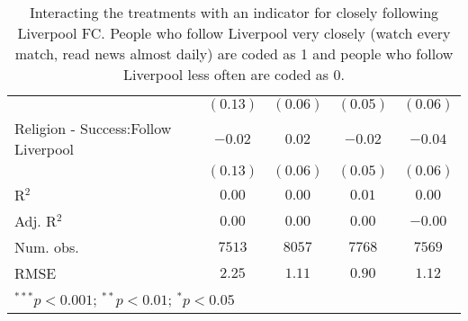 \begin{table}[H]
\begin{center}
\begin{footnotesize}
\begin{tabular}{l c c c c}
                                     & $(0.13)$ & $(0.06)$     & $(0.05)$     & $(0.06)$     \\
Religion - Success:Follow Liverpool  & $-0.02$  & $0.02$       & $-0.02$      & $-0.04$      \\
                                     & $(0.13)$ & $(0.06)$     & $(0.05)$     & $(0.06)$     \\
\hline
R$^2$                                & $0.00$   & $0.00$       & $0.01$       & $0.00$       \\
Adj. R$^2$                           & $0.00$   & $0.00$       & $0.00$       & $-0.00$      \\
Num. obs.                            & $7513$   & $8057$       & $7768$       & $7569$       \\
RMSE                                 & $2.25$   & $1.11$       & $0.90$       & $1.12$       \\
\hline
\multicolumn{5}{l}{\tiny{$^{***}p<0.001$; $^{**}p<0.01$; $^{*}p<0.05$}}
\end{tabular}
\end{footnotesize}
\caption{Interacting the treatments with an indicator for closely following Liverpool FC. People who follow 
       Liverpool very closely (watch every match, read news almost daily) are coded as 1 and people who follow Liverpool 
       less often are coded as 0.}
\label{tab:ate_follow}
\end{center}
\end{table}
